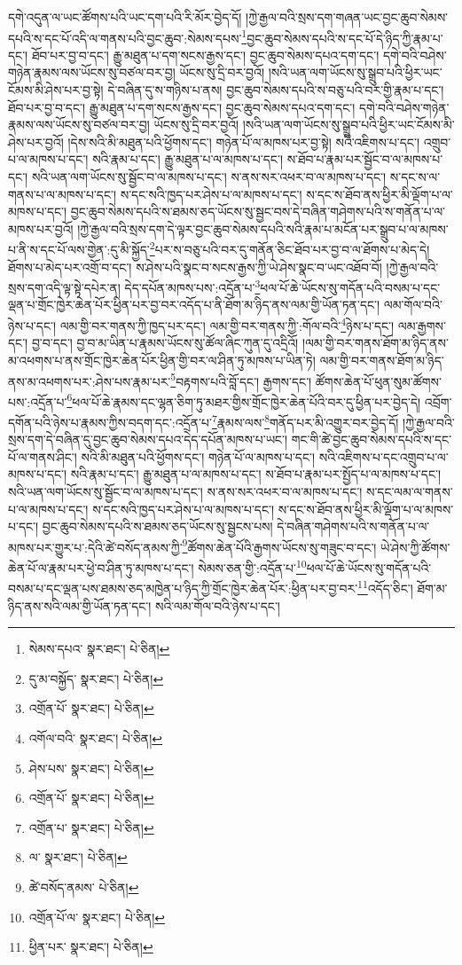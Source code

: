 དགེ་འདུན་ལ་ཡང་ཚོགས་པའི་ཡང་དག་པའི་རི་མོར་བྱེད་དོ། །ཀྱེ་རྒྱལ་བའི་སྲས་དག་གཞན་ཡང་བྱང་ཆུབ་སེམས་དཔའི་ས་དང་པོ་འདི་ལ་གནས་པའི་བྱང་ཆུབ་:སེམས་དཔས་\footnote{སེམས་དཔའ་  སྣར་ཐང་།  པེ་ཅིན། }བྱང་ཆུབ་སེམས་དཔའི་ས་དང་པོ་དེ་ཉིད་ཀྱི་རྣམ་པ་དང་། ཐོབ་པར་བྱ་བ་དང་། རྒྱུ་མཐུན་པ་དག་སངས་རྒྱས་དང་། བྱང་ཆུབ་སེམས་དཔའ་དག་དང་། དགེ་བའི་བཤེས་གཉེན་རྣམས་ལས་ཡོངས་སུ་བཙལ་བར་བྱ། ཡོངས་སུ་དྲི་བར་བྱའོ། །སའི་ཡན་ལག་ཡོངས་སུ་སྒྲུབ་པའི་ཕྱིར་ཡང་ངོམས་མི་ཤེས་པར་བྱ་སྟེ། དེ་བཞིན་དུ་ས་གཉིས་པ་ནས། བྱང་ཆུབ་སེམས་དཔའི་ས་བཅུ་པའི་བར་གྱི་རྣམ་པ་དང་། ཐོབ་པར་བྱ་བ་དང་། རྒྱུ་མཐུན་པ་དག་སངས་རྒྱས་དང་། བྱང་ཆུབ་སེམས་དཔའ་དག་དང་། དགེ་བའི་བཤེས་གཉེན་རྣམས་ལས་ཡོངས་སུ་བཙལ་བར་བྱ། ཡོངས་སུ་དྲི་བར་བྱའོ། །སའི་ཡན་ལག་ཡོངས་སུ་སྒྲུབ་པའི་ཕྱིར་ཡང་ངོམས་མི་ཤེས་པར་བྱའོ། །དེས་སའི་མི་མཐུན་པའི་ཕྱོགས་དང་། གཉེན་པོ་ལ་མཁས་པར་བྱ་སྟེ། སའི་འཇིགས་པ་དང་། འགྲུབ་པ་ལ་མཁས་པ་དང་། སའི་རྣམ་པ་དང་། རྒྱུ་མཐུན་པ་ལ་མཁས་པ་དང་། ས་ཐོབ་པ་རྣམ་པར་སྦྱོང་བ་ལ་མཁས་པ་དང་། སའི་ཡན་ལག་ཡོངས་སུ་སྦྱོང་བ་ལ་མཁས་པ་དང་། ས་ནས་སར་འཕར་བ་ལ་མཁས་པ་དང་། ས་དང་ས་ལ་གནས་པ་ལ་མཁས་པ་དང་། ས་དང་སའི་ཁྱད་པར་ཤེས་པ་ལ་མཁས་པ་དང་། ས་དང་ས་ཐོབ་ནས་ཕྱིར་མི་ལྡོག་པ་ལ་མཁས་པ་དང་། བྱང་ཆུབ་སེམས་དཔའི་ས་ཐམས་ཅད་ཡོངས་སུ་སྦྱང་བས་དེ་བཞིན་གཤེགས་པའི་ས་གནོན་པ་ལ་མཁས་པར་བྱའོ། །ཀྱེ་རྒྱལ་བའི་སྲས་དག་དེ་ལྟར་བྱང་ཆུབ་སེམས་དཔའི་སའི་རྣམ་པ་མངོན་པར་སྒྲུབ་པ་ལ་མཁས་པ་ནི་ས་དང་པོ་ལས་གྱེན་:དུ་མི་སྐྱོད་\footnote{དུ་མ་བསྐྱོད་  སྣར་ཐང་།  པེ་ཅིན། }པར་ས་བཅུ་པའི་བར་དུ་གནོན་ཅིང་ཐོབ་པར་བྱ་བ་ལ་ཐོགས་པ་མེད་དེ། ཐོགས་པ་མེད་པར་འགྲོ་བ་དང་། ས་ཤེས་པའི་སྣང་བ་སངས་རྒྱས་ཀྱི་ཡེ་ཤེས་སྣང་བ་ཡང་འཐོབ་བོ། །ཀྱེ་རྒྱལ་བའི་སྲས་དག་འདི་ལྟ་སྟེ་དཔེར་ན། དེད་དཔོན་མཁས་པས་:འདྲོན་པ་\footnote{འགྲོན་པོ་  སྣར་ཐང་།  པེ་ཅིན། }ཕལ་པོ་ཆེ་ཡོངས་སུ་གདོན་པའི་བསམ་པ་དང་ལྡན་པ་གྲོང་ཁྱེར་ཆེན་པོར་ཕྱིན་པར་བྱ་བར་འདོད་པ་ནི་ཐོག་མ་ཉིད་ནས་ལམ་གྱི་ཡོན་ཏན་དང་། ལམ་གོལ་བའི་ཉེས་པ་དང་། ལམ་གྱི་བར་གནས་ཀྱི་ཁྱད་པར་དང་། ལམ་གྱི་བར་གནས་ཀྱི་:གོལ་བའི་\footnote{འགོལ་བའི་  སྣར་ཐང་།  པེ་ཅིན། }ཉེས་པ་དང་། ལམ་རྒྱགས་དང་། བྱ་བ་དང་། བྱ་བ་མ་ཡིན་པ་རྣམས་ཡོངས་སུ་ཚོལ་ཞིང་ཀུན་དུ་འདྲིའོ། །ལམ་གྱི་བར་གནས་ཐོག་མ་ཉིད་ནས་མ་འཕགས་པ་ནས་གྲོང་ཁྱེར་ཆེན་པོར་ཕྱིན་གྱི་བར་ལ་ཤིན་ཏུ་མཁས་པ་ཡིན་ཏེ། ལམ་གྱི་བར་གནས་ཐོག་མ་ཉིད་ནས་མ་འཕགས་པར་:ཤེས་པས་རྣམ་པར་\footnote{ཤེས་པས་  སྣར་ཐང་།  པེ་ཅིན། }བརྟགས་པའི་བློ་དང་། རྒྱགས་དང་། ཚོགས་ཆེན་པོ་ཕུན་སུམ་ཚོགས་པས་:འདྲོན་པ་\footnote{འགྲོན་པོ་  སྣར་ཐང་།  པེ་ཅིན། }ཕལ་པོ་ཆེ་རྣམས་དང་ལྷན་ཅིག་ཏུ་མཐར་གྱིས་གྲོང་ཁྱེར་ཆེན་པོའི་བར་དུ་ཕྱིན་པར་བྱེད་དེ། འབྲོག་དགོན་པའི་ཉེས་པ་རྣམས་ཀྱིས་བདག་དང་:འདྲོན་པ་\footnote{འགྲོན་པ་  སྣར་ཐང་།  པེ་ཅིན། }རྣམས་ལས་\footnote{ལ་  སྣར་ཐང་།  པེ་ཅིན། }གནོད་པར་མི་འགྱུར་བར་བྱེད་དོ། །ཀྱེ་རྒྱལ་བའི་སྲས་དག་དེ་བཞིན་དུ་བྱང་ཆུབ་སེམས་དཔའ་དེད་དཔོན་མཁས་པ་ཡང་། གང་གི་ཚེ་བྱང་ཆུབ་སེམས་དཔའི་ས་དང་པོ་ལ་གནས་ཤིང་། སའི་མི་མཐུན་པའི་ཕྱོགས་དང་། གཉེན་པོ་ལ་མཁས་པ་དང་། སའི་འཇིགས་པ་དང་འགྲུབ་པ་ལ་མཁས་པ་དང་། སའི་རྣམ་པ་དང་། རྒྱུ་མཐུན་པ་ལ་མཁས་པ་དང་། ས་ཐོབ་པ་རྣམ་པར་སྤྱོད་པ་ལ་མཁས་པ་དང་། སའི་ཡན་ལག་ཡོངས་སུ་སྦྱོང་བ་ལ་མཁས་པ་དང་། ས་ནས་སར་འཕར་བ་ལ་མཁས་པ་དང་། ས་དང་ལམ་ལ་གནས་པ་ལ་མཁས་པ་དང་། ས་དང་སའི་ཁྱད་པར་ཤེས་པ་ལ་མཁས་པ་དང་། ས་དང་ས་ཐོབ་ནས་ཕྱིར་མི་ལྡོག་པ་ལ་མཁས་པ་དང་། བྱང་ཆུབ་སེམས་དཔའི་ས་ཐམས་ཅད་ཡོངས་སུ་སྦྱངས་པས། དེ་བཞིན་གཤེགས་པའི་ས་གནོན་པ་ལ་མཁས་པར་གྱུར་པ་:དེའི་ཚེ་བསོད་ནམས་ཀྱི་\footnote{ཚེ་བསོད་ནམས་  པེ་ཅིན། }ཚོགས་ཆེན་པོའི་རྒྱགས་ཡོངས་སུ་གཟུང་བ་དང་། ཡེ་ཤེས་ཀྱི་ཚོགས་ཆེན་པོ་ལ་རྣམ་པར་ཕྱེ་བ་ཤིན་ཏུ་མཁས་པ་དང་། སེམས་ཅན་གྱི་:འདྲོན་པ་\footnote{འགྲོན་པོ་ལ་  སྣར་ཐང་།  པེ་ཅིན། }ཕལ་པོ་ཆེ་ཡོངས་སུ་གདོན་པའི་བསམ་པ་དང་ལྡན་པས་ཐམས་ཅད་མཁྱེན་པ་ཉིད་ཀྱི་གྲོང་ཁྱེར་ཆེན་པོར་:ཕྱིན་པར་བྱ་བར་\footnote{ཕྱིན་པར་  སྣར་ཐང་།  པེ་ཅིན། }འདོད་ཅིང་། ཐོག་མ་ཉིད་ནས་སའི་ལམ་གྱི་ཡོན་ཏན་དང་། སའི་ལམ་གོལ་བའི་ཉེས་པ་དང་། 
